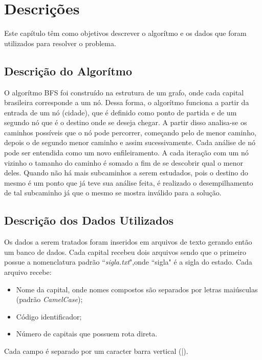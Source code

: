\chapter*[Descrições]{Descrições}

Este capítulo têm como objetivos descrever o algorítmo e os dados que foram utilizados para resolver o problema.

\section{Descrição do Algorítmo}

O algorítmo BFS foi construído na estrutura de um grafo, onde cada capital brasileira corresponde a um nó. 
Dessa forma, o algorítmo funciona a partir da entrada de um nó (cidade), que é definido como ponto de 
partida e de um segundo nó que é o destino onde se deseja chegar. A partir disso analisa-se os caminhos possíveis que o nó pode percorrer, começando pelo de menor caminho, depois o de segundo menor caminho e assim sucessivamente. Cada análise de nó pode ser entendida como um novo enfileiramento. A cada iteração com um nó vizinho o tamanho do caminho é somado a fim de se descobrir qual o menor deles. Quando não há mais subcaminhos a serem estudados, pois o destino do mesmo é um ponto que já teve sua análise feita, é realizado o desempilhamento de tal subcaminho já que o mesmo se mostra inválido para a solução.

\section{Descrição dos Dados Utilizados}

Os dados a serem tratados foram inseridos em arquivos de texto gerando então um banco de dados. Cada 
capital recebeu dois arquivos sendo que o primeiro possue a nomenclatura padrão ``\textit{sigla.txt}",onde ``sigla" é a sigla do estado. Cada arquivo recebe: 

\begin{itemize}
 	\item Nome da capital, onde nomes compostos são separados por letras maiúsculas (padrão \textit{CamelCase});
    \item Código identificador;
	\item Número de capitais que possuem rota direta. 
\end{itemize}

Cada campo é separado por um caracter barra vertical (|). 

